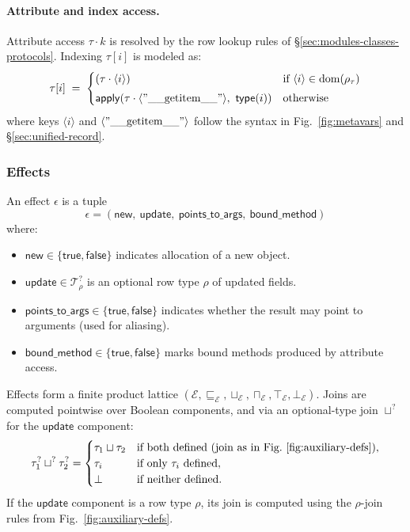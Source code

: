 \paragraph{Attribute and index access.}  
\label{sec:rows-generic-access}
Attribute access $\tau \cdot k$ is resolved by the row lookup rules of \S\ref{sec:modules-classes-protocols}.  
Indexing $\tau[i]$ is modeled as:
\[
\tau[i] \;=\;
\begin{cases}
(\tau \cdot \langle i\rangle) & \text{if $\langle i\rangle \in \mathrm{dom}(\rho_\tau)$} \\[0.3em]
\mathsf{apply}(\tau \cdot \langle \mathrm{"\_\_getitem\_\_"}\rangle,\ \mathsf{type}(i)) & \text{otherwise}
\end{cases}
\]
where keys $\langle i\rangle$ and $\langle \mathrm{"\_\_getitem\_\_"}\rangle$ follow the syntax in Fig.~\ref{fig:metavars} and \S\ref{sec:unified-record}.

\subsubsection*{Effects}
\label{sec:effects}
An effect $\epsilon$ is a tuple
\[
\epsilon = (\mathsf{new},\ \mathsf{update},\ \mathsf{points\_to\_args},\ \mathsf{bound\_method})
\]
where:
\begin{itemize}
  \item $\mathsf{new} \in \{\mathsf{true},\mathsf{false}\}$ indicates allocation of a new object.
  \item $\mathsf{update} \in \mathcal{T}^?_{\rho}$ is an optional row type $\rho$ of updated fields.
  \item $\mathsf{points\_to\_args} \in \{\mathsf{true},\mathsf{false}\}$ indicates whether the result may point to arguments (used for aliasing).
  \item $\mathsf{bound\_method} \in \{\mathsf{true},\mathsf{false}\}$ marks bound methods produced by attribute access.
\end{itemize}

Effects form a finite product lattice $(\mathcal{E}, \sqsubseteq_{\mathcal{E}}, \sqcup_{\mathcal{E}}, \sqcap_{\mathcal{E}}, \top_{\mathcal{E}}, \bot_{\mathcal{E}})$.  
Joins are computed pointwise over Boolean components, and via an optional-type join $\sqcup^?$ for the $\mathsf{update}$ component:
\[
\tau_1^? \sqcup^? \tau_2^? =
\begin{cases}
\tau_1 \sqcup \tau_2 & \text{if both defined (join as in Fig.~\ref{fig:auxiliary-defs})},\\
\tau_i & \text{if only $\tau_i$ defined},\\
\bot & \text{if neither defined}.
\end{cases}
\]
If the $\mathsf{update}$ component is a row type $\rho$, its join is computed using the $\rho$-join rules from Fig.~\ref{fig:auxiliary-defs}.

